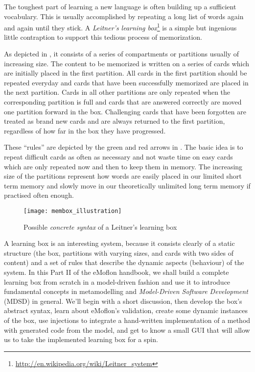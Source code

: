 \genHeader

The toughest part of learning a new language  is often building up a sufficient vocabulary. This is usually accomplished by repeating a long list of words again
and again until they stick. A \emph{Leitner's learning box}\footnote{\url{http://en.wikipedia.org/wiki/Leitner_system}} is a simple but ingenious little
contraption to support this tedious process of memorization.

As depicted in , it consists of a series of compartments or partitions usually of increasing size. The content to be memorized
is written on a series of cards  which are initially placed in the first partition. All cards in the first  partition should be repeated everyday and cards that
have been successfully memorized are placed in the next partition. Cards in all other partitions are only repeated when the corresponding partition is full and
cards that are answered correctly are moved one partition forward in the box. Challenging cards that have been forgotten are treated as brand new cards and
are always returned to the first partition, regardless of how far in the box they have progressed.

These ``rules'' are depicted by the green and red arrows in . The basic idea is to repeat difficult cards as often as
necessary and not waste time on easy cards which are only repeated now and then to keep them in memory. The increasing size of the partitions represent how
words are easily placed in our limited short term memory and slowly move in our theoretically unlimited long term memory if practised often enough.

 \begin{figure}[htp]
 \begin{center}
   \texttt{[image: membox\_illustration]}
   \caption[]{Possible \emph{concrete syntax} of a Leitner's learning box}
   \label{fig:membox_illustration}
 \end{center}
 \end{figure}
 \FloatBarrier

A learning box is an interesting system, because it consists clearly of a static structure (the box, partitions with varying sizes, and cards with two sides
of content) and a set of rules that describe the dynamic aspects (behaviour) of the system. In this Part II of the eMoflon handbook,
we shall build a complete learning box from scratch in a model-driven fashion and use it to introduce fundamental concepts in metamodelling and \emph{Model-Driven Software 
Development} (MDSD) in general. We'll begin with a short discussion, then develop the box's abstract syntax, learn about eMoflon's validation, create
some dynamic instances of the box, use injections to integrate a hand-written implementation of a method with generated code from the model, and get to know a
small GUI that will allow us to take the implemented learning box for a spin.
